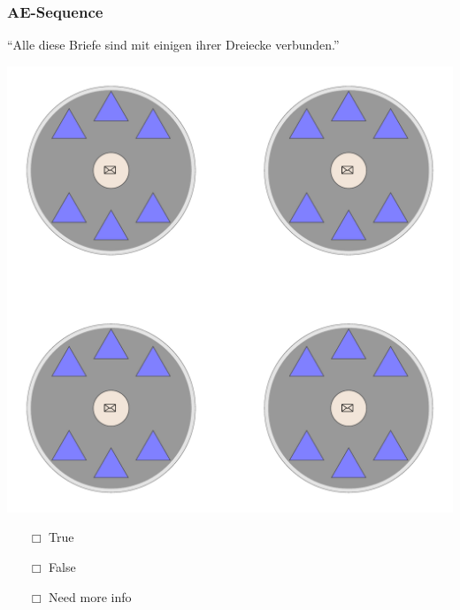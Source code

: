 \documentclass[fleqn,10pt,xcolor=dvipsnames]{beamer}
\renewcommand{\AE}{AE\xspace}
\newcommand{\mymark}[1]{{\color{mycol}{#1}}}
\begin{document}
\begin{frame}
  \frametitle{\AE-Sequence}
  \begin{center}
    ``Alle diese Briefe sind mit einigen ihrer Dreiecke verbunden.''

    \vspace{0.1cm}

    \includegraphics[width=0.5 \textwidth]{../../pictures/ae_01_1.pdf}

    \vspace{0.1cm}

    \begin{multicols}{3}
      \begin{itemize} 
      \item[$\Box$] True\\
        \onslide<2>{$\leadsto$  \mymark{false}}
      \item[$\Box$] False\\
        \onslide<2>{$\leadsto$ \mymark{false}}
      \item[$\Box$] Need more info 
      \end{itemize}
    \end{multicols}

  \end{center}
\end{frame}
\end{document}
